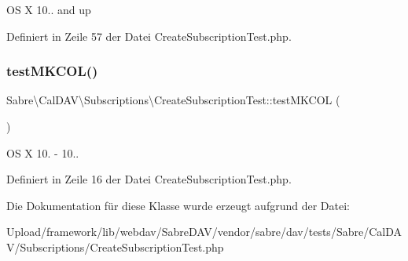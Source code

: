 OS X 10.. and up 

Definiert in Zeile 57 der Datei Create\+Subscription\+Test.\+php.

\mbox{\label{class_sabre_1_1_cal_d_a_v_1_1_subscriptions_1_1_create_subscription_test_a466e9c79d209d5bbba893c116ee74979}} 
\subsubsection{\texorpdfstring{test\+M\+K\+C\+O\+L()}{testMKCOL()}}
{\footnotesize\ttfamily Sabre\textbackslash{}\+Cal\+D\+A\+V\textbackslash{}\+Subscriptions\textbackslash{}\+Create\+Subscription\+Test\+::test\+M\+K\+C\+OL (\begin{DoxyParamCaption}{ }\end{DoxyParamCaption})}

OS X 10. -\/ 10.. 

Definiert in Zeile 16 der Datei Create\+Subscription\+Test.\+php.



Die Dokumentation für diese Klasse wurde erzeugt aufgrund der Datei\+:\begin{DoxyCompactItemize}
\item 
Upload/framework/lib/webdav/\+Sabre\+D\+A\+V/vendor/sabre/dav/tests/\+Sabre/\+Cal\+D\+A\+V/\+Subscriptions/Create\+Subscription\+Test.\+php\end{DoxyCompactItemize}

